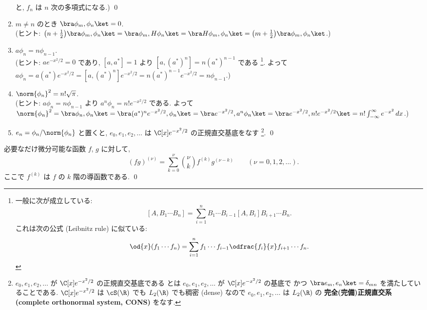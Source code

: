 \documentclass[12pt,twoside]{jarticle}
\begin{document}
\begin{question}[量子調和振動子, 15点]
\begin{enumerate}
    と, $f_n$ は $n$ 次の多項式になる.)
    \qed
  \item $m\ne n$ のとき $\bra \phi_m,\phi_n\ket = 0$.
    \\(ヒント: $\bigl(n+\frac{1}{2}\bigr)\bra\phi_m,\phi_n\ket
    = \bra\phi_m,H\phi_n\ket 
    = \bra H\phi_m,\phi_n\ket
    = \bigl(m+\frac{1}{2}\bigr)\bra\phi_m,\phi_n\ket$.)
  \item $a\phi_n = n \phi_{n-1}$.
    \\(ヒント: $a e^{-x^2/2}=0$ であり, 
    $[a,a^*]=1$ より $[a,(a^*)^n]=n (a^*)^{n-1}$ である%
    \footnote{一般に次が成立している: $$[A,B_1\cdots B_n]
      =\sum_{i=1}^n B_1\cdots B_{i-1}[A,B_i]B_{i+1}\cdots B_n.$$
      これは次の公式 (Leibnitz rule) に似ている: $$\od{x}(f_1\cdots f_n)
      =\sum_{i=1}^n f_1\cdots f_{i-1}\odfrac{f_i}{x}f_{i+1}\cdots f_n.$$}. 
    よって $a\phi_n = a(a^*)e^{-x^2/2} = [a,(a^*)^n]e^{-x^2/2} 
    = n(a^*)^{n-1} e^{-x^2/2} = n\phi_{n-1}$.)
  \item $\norm{\phi_n}^2 = n!\sqrt{\pi}$.
    \\(ヒント: $a\phi_n = n\phi_{n-1}$ より $a^n\phi_n = n!e^{-x^2/2}$ である.
    よって $\norm{\phi_n}^2 = \bra\phi_n,\phi_n\ket
    = \bra (a^*)^n e^{-x^2/2},\phi_n\ket
    = \bra e^{-x^2/2},a^n\phi_n\ket
    = \bra e^{-x^2/2},n! e^{-x^2/2}\ket
    = n!\int_{-\infty}^\infty e^{-x^2}\,dx$.)
  \item $e_n = \phi_n/\norm{\phi_n}$ と置くと, $e_0,e_1,e_2,\ldots$ 
    は $\C[x]e^{-x^2/2}$ の正規直交基底をなす%
    \footnote{$e_0,e_1,e_2,\ldots$ が $\C[x]e^{-x^2/2}$ の正規直交基底である
      とは $e_0,e_1,e_2,\ldots$ が $\C[x]e^{-x^2/2}$ の基底で
      かつ $\bra e_m,e_n\ket = \delta_{mn}$ を満たしていることである.
      $\C[x]e^{-x^2/2}$ は $\cS(\R)$ でも $L_2(\R)$ でも稠密 (dense)
      なので $e_0,e_1,e_2,\ldots$ は $L_2(\R)$ の
      {\bf 完全(完備)正規直交系 (complete orthonormal system, CONS)} をなす.}.
    \qed
  \end{enumerate}
\end{question}


\begin{question}
\label{q:Leibnitz-formula}
  必要なだけ微分可能な函数 $f$, $g$ に対して,
  \begin{equation*}
    (fg)^{(\nu)} = \sum_{k=0}^\nu \binom{\nu}{k} f^{(k)}g^{(\nu-k)}
    \qquad (\nu=0,1,2,\ldots).
  \end{equation*}
  ここで $f^{(k)}$ は $f$ の $k$ 階の導函数である. \qed
\end{question}
\end{document}
